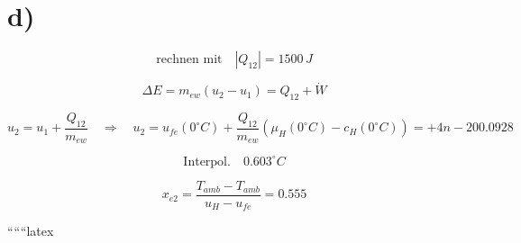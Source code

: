 

\section*{d)}

\[
\text{rechnen mit} \quad |Q_{12}| = 1500 \, J
\]

\[
\Delta E = m_{ew} (u_2 - u_1) = Q_{12} + \dot{W}
\]

\[
u_2 = u_1 + \frac{Q_{12}}{m_{ew}} \quad \Rightarrow \quad u_2 = u_{fe}(0^\circ C) + \frac{Q_{12}}{m_{ew}} \left( \mu_{H}(0^\circ C) - c_{H}(0^\circ C) \right) = + 4n - 200.0928
\]

\[
\text{Interpol.} \quad 0.603^\circ C
\]

\[
x_{e2} = \frac{T_{amb} - T_{amb}}{u_{H} - u_{fe}} = 0.555
\]

``````latex